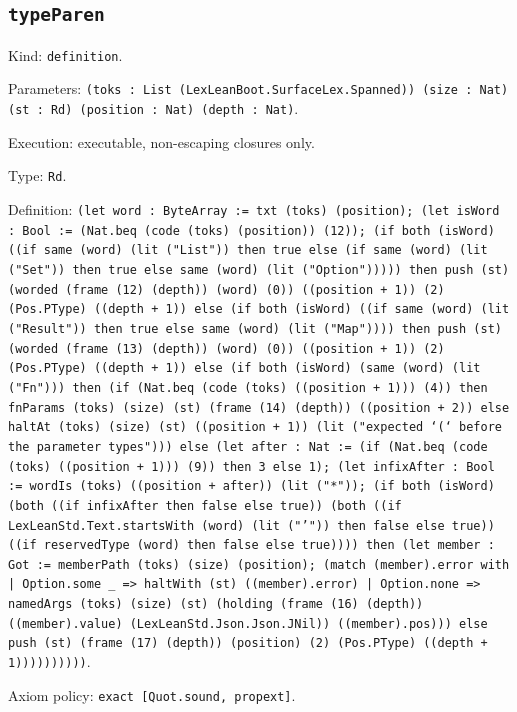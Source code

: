 \documentclass[11pt]{article}
\begin{document}
\subsection*{\texttt{typeParen}}
\noindent Kind: \texttt{definition}.\par
\noindent Parameters: \texttt{(toks : List (LexLeanBoot.SurfaceLex.Spanned)) (size : Nat) (st : Rd) (position : Nat) (depth : Nat)}.\par
\noindent Execution: executable, non-escaping closures only.\par
\noindent Type: \texttt{Rd}.\par
\noindent Definition: \texttt{(let word : ByteArray := txt (toks) (position); (let isWord : Bool := (Nat.beq (code (toks) (position)) (12)); (if both (isWord) ((if same (word) (lit ("List")) then true else (if same (word) (lit ("Set")) then true else same (word) (lit ("Option"))))) then push (st) (worded (frame (12) (depth)) (word) (0)) ((position + 1)) (2) (Pos.PType) ((depth + 1)) else (if both (isWord) ((if same (word) (lit ("Result")) then true else same (word) (lit ("Map")))) then push (st) (worded (frame (13) (depth)) (word) (0)) ((position + 1)) (2) (Pos.PType) ((depth + 1)) else (if both (isWord) (same (word) (lit ("Fn"))) then (if (Nat.beq (code (toks) ((position + 1))) (4)) then fnParams (toks) (size) (st) (frame (14) (depth)) ((position + 2)) else haltAt (toks) (size) (st) ((position + 1)) (lit ("expected `(` before the parameter types"))) else (let after : Nat := (if (Nat.beq (code (toks) ((position + 1))) (9)) then 3 else 1); (let infixAfter : Bool := wordIs (toks) ((position + after)) (lit ("*")); (if both (isWord) (both ((if infixAfter then false else true)) (both ((if LexLeanStd.Text.startsWith (word) (lit ("'")) then false else true)) ((if reservedType (word) then false else true)))) then (let member : Got := memberPath (toks) (size) (position); (match (member).error with | Option.some \_ => haltWith (st) ((member).error) | Option.none => namedArgs (toks) (size) (st) (holding (frame (16) (depth)) ((member).value) (LexLeanStd.Json.Json.JNil)) ((member).pos))) else push (st) (frame (17) (depth)) (position) (2) (Pos.PType) ((depth + 1))))))))))}.\par
\noindent Axiom policy: \texttt{exact [Quot.sound, propext]}.\par
\end{document}
